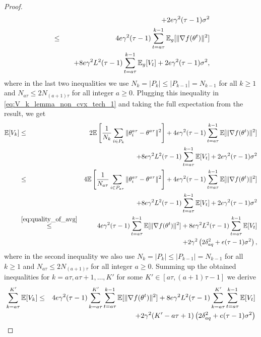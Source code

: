 \begin{proof}
\begin{eqnarray}
         &&\quad + 2e\gamma^2(\tau-1)\sigma^2\notag\\
         &\le& 4e\gamma^2(\tau-1) \sum\limits_{t=a\tau}^{k-1}\mathbb{E}_g[\|\nabla f(\theta^t)\|^2] \notag\\
         &&\quad + 8e\gamma^2L^2(\tau-1) \sum\limits_{t=a\tau}^{k-1}\mathbb{E}_g[V_t] + 2e\gamma^2(\tau-1)\sigma^2,\notag
     \end{eqnarray}
     where in the last two inequalities we use $N_k = |P_k| \le |P_{k-1}| = N_{k-1}$ for all $k\ge 1$ and $N_{a\tau} \le 2 N_{(a+1)\tau}$ for all integer $a \ge 0$. Plugging this inequality in \eqref{eq:V_k_lemma_non_cvx_tech_1} and taking the full expectation from the result, we get
     \begin{eqnarray}
         \mathbb{E}[V_k] &\le& 2\mathbb{E}\left[\frac{1}{N_k}\sum\limits_{i\in P_k}\|\theta_i^{a\tau} - \theta^{a\tau}\|^2\right] + 4e\gamma^2(\tau-1) \sum\limits_{t=a\tau}^{k-1}\mathbb{E}[\|\nabla f(\theta^t)\|^2]\notag\\
         &&\quad + 8e\gamma^2L^2(\tau-1) \sum\limits_{t=a\tau}^{k-1}\mathbb{E}[V_t] + 2e\gamma^2(\tau-1)\sigma^2\notag\\
         &\le& 4\mathbb{E}\left[\frac{1}{N_{a\tau}}\sum\limits_{i\in P_{a\tau}}\|\theta_i^{a\tau} - \theta^{a\tau}\|^2\right] + 4e\gamma^2(\tau-1) \sum\limits_{t=a\tau}^{k-1}\mathbb{E}[\|\nabla f(\theta^t)\|^2] \notag\\
         &&\quad + 8e\gamma^2L^2(\tau-1) \sum\limits_{t=a\tau}^{k-1}\mathbb{E}[V_t] + 2e\gamma^2(\tau-1)\sigma^2\notag\\
         &\overset{\eqref{eq:quality_of_avg}}{\le}& 4e\gamma^2(\tau-1) \sum\limits_{t=a\tau}^{k-1}\mathbb{E}[\|\nabla f(\theta^t)\|^2] + 8e\gamma^2L^2(\tau-1) \sum\limits_{t=a\tau}^{k-1}\mathbb{E}[V_t]\notag\\
         &&\quad + 2\gamma^2\left(2\delta_{aq}^2 + e(\tau-1)\sigma^2\right),\notag
     \end{eqnarray}
     where in the second inequality we also use $N_k = |P_k| \le |P_{k-1}| = N_{k-1}$ for all $k\ge 1$ and $N_{a\tau} \le 2 N_{(a+1)\tau}$ for all integer $a \ge 0$. Summing up the obtained inequalities for $k = a\tau, a\tau+1,\ldots, K'$ for some $K' \in[a\tau, (a+1)\tau-1]$ we derive
     \begin{eqnarray*}
         \sum\limits_{k=a\tau}^{K'}\EE[V_k] &\le& 4e\gamma^2(\tau-1)\sum\limits_{k=a\tau}^{K'} \sum\limits_{t=a\tau}^{k-1}\EE[\|\nabla f(\theta^t)\|^2] + 8e\gamma^2L^2(\tau-1) \sum\limits_{k=a\tau}^{K'}\sum\limits_{t=a\tau}^{k-1}\EE[V_t]\\
         &&\quad + 2\gamma^2(K'-a\tau+1)\left(2\delta_{aq}^2 + e(\tau-1)\sigma^2\right)\\

\end{eqnarray*}
\end{proof}
